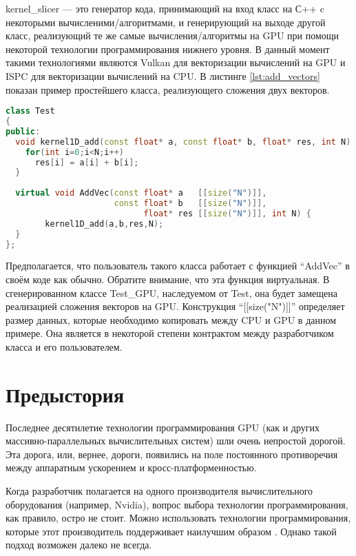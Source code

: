 \documentclass[11pt,fleqn,english,russian]{report} %
\begin{document}
kernel\_slicer --- это генератор кода, принимающий на вход класс на С++ c некоторыми вычисленими/алгоритмами, и генерирующий на выходе другой класс, реализующий те же самые вычисления/алгоритмы на GPU при помощи некоторой технологии программирования нижнего уровня. В данный момент такими технологиями являются Vulkan для векторизации вычислений на GPU и ISPC \cite{ispc} для векторизации вычислений на CPU. В листинге \ref{lst:add_vectors} показан пример простейшего класса, реализующего сложения двух векторов.

\begin{lstlisting}[language=C++, caption=сложение двух векторов]
class Test 
{
public:	
  void kernel1D_add(const float* a, const float* b, float* res, int N) {
    for(int i=0;i<N;i++)
      res[i] = a[i] + b[i];
  } 
	
  virtual void AddVec(const float* a   [[size("N")]], 
                      const float* b   [[size("N")]], 
                            float* res [[size("N")]], int N) {
		kernel1D_add(a,b,res,N); 
  } 	
};
\end{lstlisting}\label{lst:add_vectors}

Предполагается, что пользователь такого класса работает с функцией ``AddVec'' в своём коде как обычно. Обратите внимание, что эта функция виртуальная. В сгенерированном классе Test\_GPU, наследуемом от Test, она будет замещена реализацией сложения векторов на GPU. Конструкция ``[[size("N")]]'' определяет размер данных, которые необходимо копировать между CPU и GPU в данном примере. Она является в некоторой степени контрактом между разработчиком класса и его пользователем.

\section{Предыстория}

Последнее десятилетие технологии программирования GPU (как и других массивно-параллельных вычислительных систем) шли очень непростой дорогой. Эта дорога, или, вернее, дороги, появились на поле постоянного противоречия между аппаратным ускорением и кросс-платформенностью. 

Когда разработчик полагается на одного производителя вычислительного оборудования (например, Nvidia), вопрос выбора технологии программирования, как правило, остро не стоит. Можно использовать технологии программирования, которые этот производитель поддерживает наилучшим образом \cite{NVCPP,CUDA,OpenACC}. Однако такой подход возможен далеко не всегда. 
\end{document}
